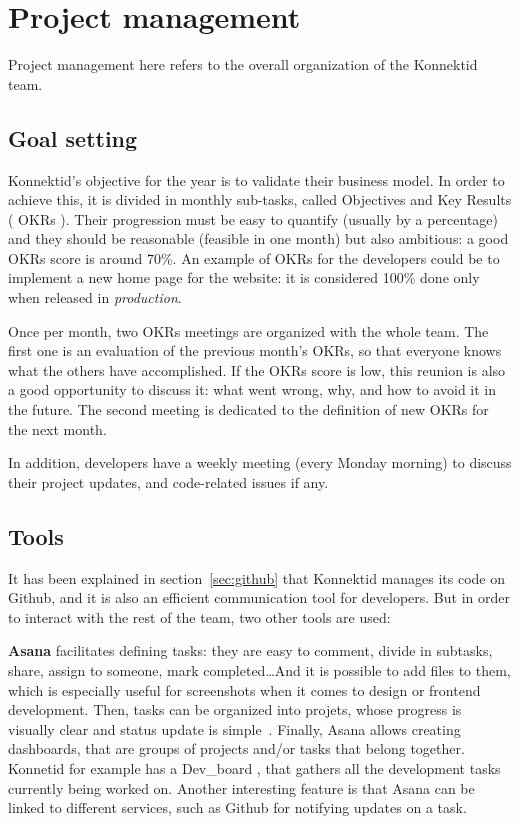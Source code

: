\section{Project management}
\label{sec:management}

Project management here refers to the overall organization of the Konnektid team.

\subsection{Goal setting}
\label{ssec:goalSetting}

Konnektid's objective for the year is to validate their business model. In order to achieve this, it is divided in monthly sub-tasks, called Objectives and Key Results (\guillemotleft{} OKRs \guillemotright{}). Their progression must be easy to quantify (usually by a percentage) and they should be reasonable (feasible in one month) but also ambitious: a good OKRs score is around 70\%. An example of OKRs for the developers could be to implement a new home page for the website: it is considered 100\% done only when released in \textit{production}.

Once per month, two OKRs meetings are organized with the whole team. The first one is an evaluation of the previous month's OKRs, so that everyone knows what the others have accomplished. If the OKRs score is low, this reunion is also a good opportunity to discuss it: what went wrong, why, and how to avoid it in the future. The second meeting is dedicated to the definition of new OKRs for the next month.

In addition, developers have a weekly meeting (every Monday morning) to discuss their project updates, and code-related issues if any.

\subsection{Tools}
\label{ssec:tools}

It has been explained in {\sc section}~\ref{sec:github} that Konnektid manages its code on Github, and it is also an efficient communication tool for developers. But in order to interact with the rest of the team, two other tools are used:

\textbf{Asana} facilitates defining tasks: they are easy to comment, divide in subtasks, share, assign to someone, mark completed\ldots And it is possible to add files to them, which is especially useful for screenshots when it comes to design or frontend development. Then, tasks can be organized into projets, whose progress is visually clear and status update is simple~\cite{asana}. Finally, Asana allows creating dashboards, that are groups of projects and/or tasks that belong together. Konnetid for example has a \guillemotleft{} Dev\_board \guillemotright{}, that gathers all the development tasks currently being worked on. Another interesting feature is that Asana can be linked to different services, such as Github for notifying updates on a task.

